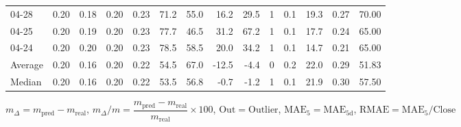 \begin{threeparttable}
{\begin{tabular}{lrrrrrrrrrrrrr}
  04-28 &          0.20 &          0.18 &          0.20 &        0.23 &                71.2 &                55.0 &       16.2 &         29.5 &              1 &                 0.1 &             19.3 &            0.27 &                  70.00 \\
  04-25 &          0.20 &          0.19 &          0.20 &        0.23 &                77.7 &                46.5 &       31.2 &         67.2 &              1 &                 0.1 &             17.7 &            0.24 &                  65.00 \\
  04-24 &          0.20 &          0.20 &          0.20 &        0.23 &                78.5 &                58.5 &       20.0 &         34.2 &              1 &                 0.1 &             14.7 &            0.21 &                  65.00 \\
Average &          0.20 &          0.16 &          0.20 &        0.22 &                54.5 &                67.0 &      -12.5 &         -4.4 &              0 &                 0.2 &             22.0 &            0.29 &                  51.83 \\
 Median &          0.20 &          0.16 &          0.20 &        0.22 &                53.5 &                56.8 &       -0.7 &         -1.2 &              1 &                 0.1 &             21.9 &            0.30 &                  57.50 \\
\bottomrule
\end{tabular}
}
\begin{tablenotes}\footnotesize
\item $m_\Delta=m_{\text{pred}}-m_{\text{real}}$,
$m_\Delta/m=\dfrac{m_{\text{pred}}-m_{\text{real}}}{m_{\text{real}}}\times100$,
$\mathrm{Out}=\text{Outlier}$,
$\mathrm{MAE}_5=\mathrm{MAE}_{5\text{d}}$,
$\mathrm{RMAE}=\mathrm{MAE}_5/\text{Close}$
\end{tablenotes}
\end{threeparttable}
\endgroup

